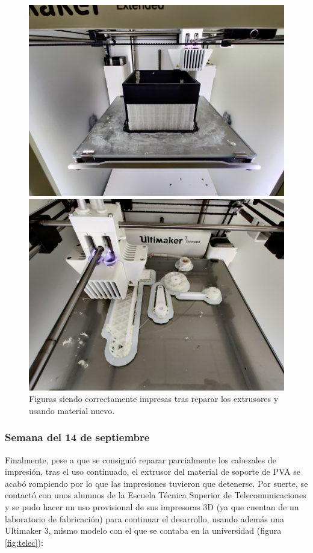 \begin{figure}[H]
    \centering
    \begin{minipage}{.49\linewidth}
        \includegraphics[width=\linewidth]{pictures/box_good.jpg}
    \end{minipage}
    \hfill
    \begin{minipage}{.49\linewidth}
        \includegraphics[width=\linewidth]{pictures/pieces_good.jpg}
    \end{minipage}
    \caption{Figuras siendo correctamente impresas tras reparar los extrusores y usando material nuevo.}
    \label{fig:good_pieces}
\end{figure}

\subsubsection*{Semana del 14 de septiembre}
Finalmente, pese a que se consiguió reparar parcialmente los cabezales de impresión, tras el
uso continuado, el extrusor del material de soporte de \ac{PVA} se acabó rompiendo por lo que
las impresiones tuvieron que detenerse. Por suerte, se contactó con unos alumnos
de la Escuela Técnica Superior de Telecomunicaciones y se pudo hacer un uso provisional
de sus impresoras 3D (ya que cuentan de un laboratorio de fabricación) para continuar el
desarrollo, usando además una Ultimaker 3, mismo modelo con el que se contaba en la
universidad (figura \ref{fig:telec}):


